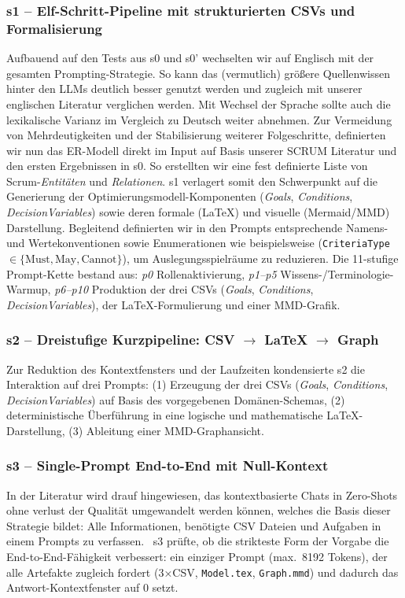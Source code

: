 \documentclass[runningheads]{llncs}
\begin{document}
\subsubsection{s1 -- Elf-Schritt-Pipeline mit strukturierten CSVs und Formalisierung}\label{subsec:s1}
Aufbauend auf den Tests aus s0 und s0' wechselten wir auf Englisch mit der gesamten Prompting-Strategie. So kann das (vermutlich) größere Quellenwissen hinter den LLMs deutlich besser genutzt werden und zugleich mit unserer englischen Literatur verglichen werden. Mit Wechsel der Sprache sollte auch die lexikalische Varianz im Vergleich zu Deutsch weiter abnehmen. Zur Vermeidung von Mehrdeutigkeiten und der Stabilisierung weiterer Folgeschritte, definierten wir nun das ER-Modell direkt im Input auf Basis unserer SCRUM Literatur und den ersten Ergebnissen in s0. So erstellten wir eine fest definierte Liste von Scrum-\emph{Entitäten} und \emph{Relationen}. s1 verlagert somit den Schwerpunkt auf die Generierung der Optimierungsmodell-Komponenten (\emph{Goals}, \emph{Conditions}, \emph{DecisionVariables}) sowie deren formale (LaTeX) und visuelle (Mermaid/MMD) Darstellung. Begleitend definierten wir in den Prompts entsprechende Namens- und Wertekonventionen sowie Enumerationen wie beispielsweise (\texttt{CriteriaType} $\in\{\text{Must},\text{May},\text{Cannot}\}$), um Auslegungsspielräume zu reduzieren. Die 11-stufige Prompt-Kette bestand aus: \emph{p0} Rollenaktivierung, \emph{p1--p5} Wissens-/Terminologie-Warmup, \emph{p6--p10} Produktion der drei CSVs (\emph{Goals}, \emph{Conditions}, \emph{DecisionVariables}), der LaTeX-Formulierung und einer MMD-Grafik.

\subsubsection{s2 -- Dreistufige Kurzpipeline: CSV \texorpdfstring{$\rightarrow$}{->} LaTeX \texorpdfstring{$\rightarrow$}{->} Graph}\label{subsec:s2}

Zur Reduktion des Kontextfensters und der Laufzeiten kondensierte s2 die Interaktion auf drei Prompts: (1) Erzeugung der drei CSVs (\emph{Goals}, \emph{Conditions}, \emph{DecisionVariables}) auf Basis des vorgegebenen Domänen-Schemas, (2) deterministische Überführung in eine logische und mathematische LaTeX-Darstellung, (3) Ableitung einer MMD-Graphansicht. 

\subsubsection{s3 -- Single-Prompt End-to-End mit Null-Kontext}\label{subsec:s3}
In der Literatur wird drauf hingewiesen, das kontextbasierte Chats in Zero-Shots ohne verlust der Qualität umgewandelt werden können, welches die Basis dieser Strategie bildet: Alle Informationen, benötigte CSV Dateien und Aufgaben in einem Prompts zu verfassen.~\cite{ref_article5} s3 prüfte, ob die strikteste Form der Vorgabe die End-to-End-Fähigkeit verbessert: ein einziger Prompt (max.\ 8192 Tokens), der alle Artefakte zugleich fordert (3×CSV, \texttt{Model.tex}, \texttt{Graph.mmd}) und dadurch das Antwort-Kontextfenster auf 0 setzt.
\end{document}
